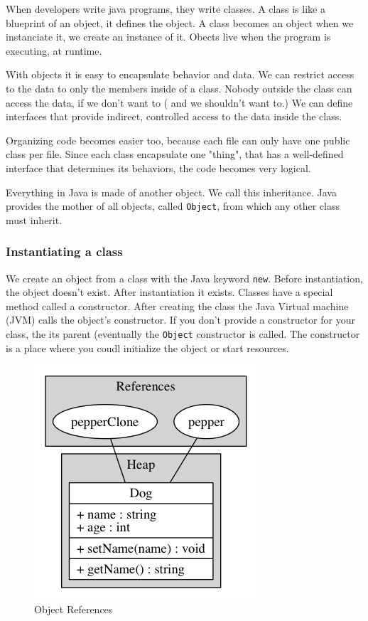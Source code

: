 When developers write java programs, they write classes. A class is like a blueprint of an object, it defines the object. A class becomes an object when we instanciate it, we create an instance of it. Obects live when the program is executing, at runtime.

With objects it is easy to encapsulate behavior and data. We can restrict access to the data to only the members inside of a class. Nobody outside the class can access the data, if we don't want to ( and we shouldn't want to.) We can define interfaces that provide indirect, controlled access to the data inside the class.

Organizing code becomes easier too, because each file can only have one  public class per file. Since each class encapsulate one "thing", that has a well-defined interface that determines its behaviors, the code becomes very logical.

Everything in Java is made of another object. We call this inheritance. Java provides the mother of all objects, called \texttt{Object}, from which any other class must inherit.

\subsubsection{Instantiating a class}
We create an object from a class with the Java keyword \texttt{new}. Before instantiation, the object doesn't exist. After instantiation it exists. Classes have a special method called a constructor. After creating the class the Java Virtual machine (JVM) calls the object's constructor. If you don't provide a constructor for your class, the its parent (eventually the \texttt{Object} constructor is called. The constructor is a place where you coudl initialize the object or start resources.\cite{nicholas}
\begin{figure}[H]\centering %
\includegraphics[width=0.5\linewidth]{object-reference}
\caption{Object References}
\label{fig:object-references}
\end{figure}
